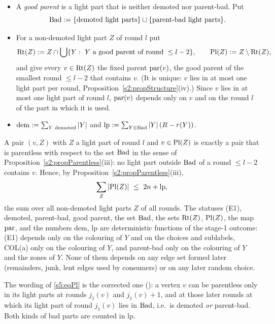 \begin{definition}
\begin{itemize}
\item A \emph{good parent} is a light part that is neither demoted nor parent-bad. Put
\[
\mathrm{Bad}\mathrel{:=}\{\text{demoted light parts}\}\cup\{\text{parent-bad light parts}\}.
\]
\item For a non-demoted light part $Z$ of round $l$ put
\[
\mathrm{Rt}(Z)\mathrel{:=} Z\cap\bigcup\{Y:\ Y\text{ a good parent of round }\le l-2\},\qquad \mathrm{Pl}(Z)\mathrel{:=} Z\setminus\mathrm{Rt}(Z),
\]
and give every $v\in\mathrm{Rt}(Z)$ the fixed parent $\mathrm{par}(v)$, the good parent of the smallest round $\le l-2$ that contains $v$. (It is unique: $v$ lies in at most one light part per round, Proposition~\ref{s2:propStructure}(iv).) Since $v$ lies in at most one light part of round $l$, $\mathrm{par}(v)$ depends only on $v$ and on the round $l$ of the part in which it is used.
\item $\mathrm{dem}\mathrel{:=}\sum_{Y\text{ demoted}}|Y|$ and $\mathrm{lp}\mathrel{:=}\sum_{Y\in\mathrm{Bad}}|Y|\,(R-r(Y))$.
\end{itemize}
A pair $(v,Z)$ with $Z$ a light part of round $l$ and $v\in\mathrm{Pl}(Z)$ is exactly a pair that is parentless with respect to the set $\mathrm{Bad}$ in the sense of Proposition~\ref{s2:propParentless}(iii): no light part outside $\mathrm{Bad}$ of a round $\le l-2$ contains $v$. Hence, by Proposition~\ref{s2:propParentless}(iii),
\begin{equation}\label{s5:eqPl}
\sum_{Z}|\mathrm{Pl}(Z)|\ \le\ 2n+\mathrm{lp},
\end{equation}
the sum over all non-demoted light parts $Z$ of all rounds. The statuses (E1), demoted, parent-bad, good parent, the set $\mathrm{Bad}$, the sets $\mathrm{Rt}(Z)$, $\mathrm{Pl}(Z)$, the map $\mathrm{par}$, and the numbers $\mathrm{dem}$, $\mathrm{lp}$ are deterministic functions of the stage-1 outcome: (E1) depends only on the colouring of $Y$ and on the choices and sublabels, COL(a) only on the colouring of $Y$, and parent-bad only on the colouring of $Y$ and the zones of $Y$. None of them depends on any edge set formed later (remainders, junk, lent edges used by consumers) or on any later random choice.
\deps{\ref{s5:defZones}, \ref{s3:defCOL}, \ref{s3:lemHB}, \ref{s2:propParentless}, \ref{s2:defAncestors}, \ref{s2:propStructure}, \ref{s2:lemTower}, \ref{s1:citDef7}}
\end{definition}

The wording of \eqref{s5:eqPl} is the corrected one (): a vertex $v$ can be parentless only in its light parts at rounds $j_1(v)$ and $j_1(v)+1$, and at those later rounds at which its light part of round $j_1(v)$ lies in $\mathrm{Bad}$, i.e.\ is demoted \emph{or} parent-bad. Both kinds of bad parts are counted in $\mathrm{lp}$.

